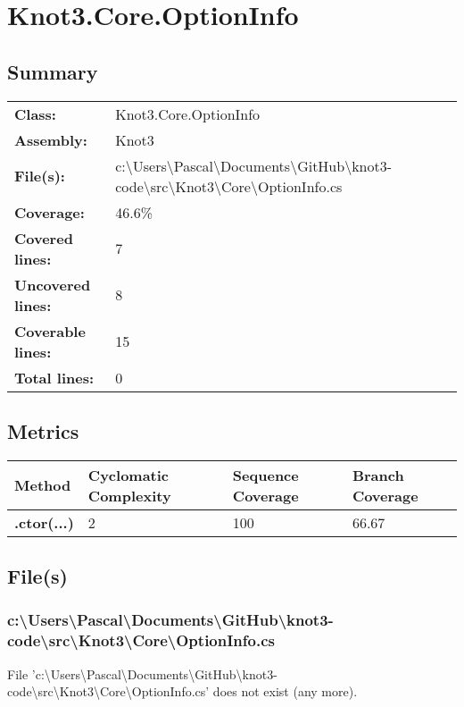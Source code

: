 \documentclass[a4paper,10pt]{article}
\begin{document}
\section{Knot3.Core.OptionInfo}
\subsection{Summary}
\begin{longtable}[l]{ll}
\textbf{Class:} & Knot3.Core.OptionInfo\\
\textbf{Assembly:} & Knot3\\
\textbf{File(s):} & \begin{minipage}[t]{12cm}{c:\textbackslash Users\textbackslash Pascal\textbackslash Documents\textbackslash GitHub\textbackslash knot3-code\textbackslash src\textbackslash Knot3\textbackslash Core\textbackslash OptionInfo.cs}\end{minipage} \\
\textbf{Coverage:} & 46.6\%\\
\textbf{Covered lines:} & 7\\
\textbf{Uncovered lines:} & 8\\
\textbf{Coverable lines:} & 15\\
\textbf{Total lines:} & 0\\
\end{longtable}
\subsection{Metrics}
\begin{longtable}[l]{|l|l|l|l|}
\hline
\textbf{Method} & \textbf{Cyclomatic Complexity} & \textbf{Sequence Coverage} & \textbf{Branch Coverage}\\
\hline
\textbf{.ctor(...)} & 2 & 100 & 66.67\\
\hline
\end{longtable}
\subsection{File(s)}
\subsubsection{c:\textbackslash Users\textbackslash Pascal\textbackslash Documents\textbackslash GitHub\textbackslash knot3-code\textbackslash src\textbackslash Knot3\textbackslash Core\textbackslash OptionInfo.cs}
 File 'c:\textbackslash Users\textbackslash Pascal\textbackslash Documents\textbackslash GitHub\textbackslash knot3-code\textbackslash src\textbackslash Knot3\textbackslash Core\textbackslash OptionInfo.cs' does not exist (any more).
\newpage
\end{document}

